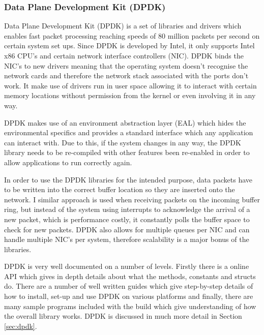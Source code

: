 \documentclass[final_report.tex]{subfiles}
\begin{document}
\subsubsection{Data Plane Development Kit (DPDK)}
\label{subsec:dpdk}
Data Plane Development Kit (DPDK) \cite{dpdk} is a set of libraries and drivers which enables fast packet processing reaching speeds of 80 million packets per second on certain system set ups. Since DPDK is developed by Intel, it only supports Intel x86 CPU's and certain network interface controllers (NIC). DPDK binds the NIC's to new drivers meaning that the operating system doesn't recognise the network cards and therefore the network stack associated with the ports don't work. It make use of drivers run in user space allowing it to interact with certain memory locations without permission from the kernel or even involving it in any way.

DPDK makes use of an environment abstraction layer (EAL) which hides the environmental specifics and provides a standard interface which any application can interact with. Due to this, if the system changes in any way, the DPDK library needs to be re-compiled with other features been re-enabled in order to allow applications to run correctly again.

In order to use the DPDK libraries for the intended purpose, data packets have to be written into the correct buffer location so they are inserted onto the network. I similar approach is used when receiving packets on the incoming buffer ring, but instead of the system using interrupts to acknowledge the arrival of a new packet, which is performance costly, it constantly polls the buffer space to check for new packets. DPDK also allows for multiple queues per NIC and can handle multiple NIC's per system, therefore scalability is a major bonus of the libraries.

DPDK is very well documented on a number of levels. Firstly there is a online API which gives in depth details about what the methods, constants and structs do. There are a number of well written guides which give step-by-step details of how to install, set-up and use DPDK on various platforms and finally, there are many sample programs included with the build which give understanding of how the overall library works. DPDK is discussed in much more detail in Section \ref{sec:dpdk}.
\end{document}
